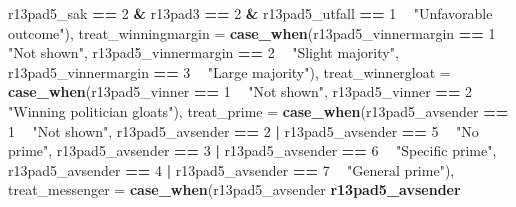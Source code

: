 \documentclass[]{book}
\newenvironment{Shaded}{\begin{snugshade}}{\end{snugshade}}
\newcommand{\KeywordTok}[1]{\textcolor[rgb]{0.13,0.29,0.53}{\textbf{#1}}}
\newcommand{\DataTypeTok}[1]{\textcolor[rgb]{0.13,0.29,0.53}{#1}}
\newcommand{\DecValTok}[1]{\textcolor[rgb]{0.00,0.00,0.81}{#1}}
\newcommand{\StringTok}[1]{\textcolor[rgb]{0.31,0.60,0.02}{#1}}
\newcommand{\OperatorTok}[1]{\textcolor[rgb]{0.81,0.36,0.00}{\textbf{#1}}}
\newcommand{\NormalTok}[1]{#1}
\begin{document}
\begin{Shaded}
\begin{Highlighting}[]
{{{{{\NormalTok{                                  r13pad5_sak }\OperatorTok{==}\StringTok{ }\DecValTok{2} \OperatorTok{&}\StringTok{ }\NormalTok{r13pad3 }\OperatorTok{==}\StringTok{ }\DecValTok{2} \OperatorTok{&}\StringTok{ }\NormalTok{r13pad5_utfall }\OperatorTok{==}\StringTok{ }\DecValTok{1} \OperatorTok{~}\StringTok{ "Unfavorable outcome"}\NormalTok{),}
         \DataTypeTok{treat_winningmargin =} \KeywordTok{case_when}\NormalTok{(r13pad5_vinnermargin }\OperatorTok{==}\StringTok{ }\DecValTok{1} \OperatorTok{~}\StringTok{ "Not shown"}\NormalTok{,}
\NormalTok{                                       r13pad5_vinnermargin }\OperatorTok{==}\StringTok{ }\DecValTok{2} \OperatorTok{~}\StringTok{ "Slight majority"}\NormalTok{,}
\NormalTok{                                       r13pad5_vinnermargin }\OperatorTok{==}\StringTok{ }\DecValTok{3} \OperatorTok{~}\StringTok{ "Large majority"}\NormalTok{),}
         \DataTypeTok{treat_winnergloat =} \KeywordTok{case_when}\NormalTok{(r13pad5_vinner }\OperatorTok{==}\StringTok{ }\DecValTok{1} \OperatorTok{~}\StringTok{ "Not shown"}\NormalTok{,}
\NormalTok{                                     r13pad5_vinner }\OperatorTok{==}\StringTok{ }\DecValTok{2} \OperatorTok{~}\StringTok{ "Winning politician gloats"}\NormalTok{),}
        \DataTypeTok{treat_prime =} \KeywordTok{case_when}\NormalTok{(r13pad5_avsender }\OperatorTok{==}\StringTok{ }\DecValTok{1} \OperatorTok{~}\StringTok{ "Not shown"}\NormalTok{,}
\NormalTok{                               r13pad5_avsender }\OperatorTok{==}\StringTok{ }\DecValTok{2}  \OperatorTok{|}\StringTok{ }\NormalTok{r13pad5_avsender }\OperatorTok{==}\StringTok{ }\DecValTok{5} \OperatorTok{~}\StringTok{ "No prime"}\NormalTok{,}
\NormalTok{                               r13pad5_avsender }\OperatorTok{==}\StringTok{ }\DecValTok{3}  \OperatorTok{|}\StringTok{ }\NormalTok{r13pad5_avsender }\OperatorTok{==}\StringTok{ }\DecValTok{6} \OperatorTok{~}\StringTok{ "Specific prime"}\NormalTok{,}
\NormalTok{                               r13pad5_avsender }\OperatorTok{==}\StringTok{ }\DecValTok{4} \OperatorTok{|}\StringTok{ }\NormalTok{r13pad5_avsender }\OperatorTok{==}\StringTok{ }\DecValTok{7} \OperatorTok{~}\StringTok{ "General prime"}\NormalTok{),}
         \DataTypeTok{treat_messenger =} \KeywordTok{case_when}\NormalTok{(r13pad5_avsender }\OperatorTok{%in%}\StringTok{ }\DecValTok{3}\OperatorTok{:}\DecValTok{4} \OperatorTok{~}\StringTok{ "Political leader"}\NormalTok{,}
\NormalTok{                                   r13pad5_avsender }\OperatorTok{%in%}\StringTok{ }\DecValTok{6}\OperatorTok{:}\DecValTok{7} \OperatorTok{~}\StringTok{ "Local newspaper"}\NormalTok{),}
}}}}}}}
\end{Highlighting}
\end{Shaded}
\end{document}
